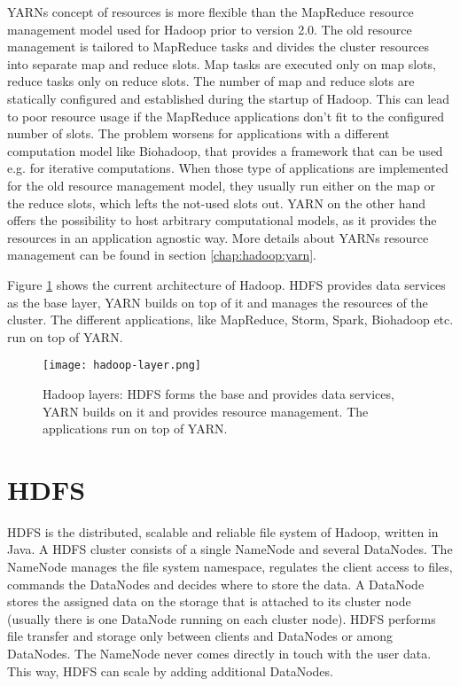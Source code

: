 YARNs concept of resources is more flexible than the MapReduce resource management model used for Hadoop prior to version 2.0. The old resource management is tailored to MapReduce tasks and divides the cluster resources into separate map and reduce slots. Map tasks are executed only on map slots, reduce tasks only on reduce slots. The number of map and reduce slots are statically configured and established during the startup of Hadoop. This can lead to poor resource usage if the MapReduce applications don't fit to the configured number of slots. The problem worsens for applications with a different computation model like Biohadoop, that provides a framework that can be used e.g. for iterative computations. When those type of applications are implemented for the old resource management model, they usually run either on the map or the reduce slots, which lefts the not-used slots out. YARN on the other hand offers the possibility to host arbitrary computational models, as it provides the resources in an application agnostic way. More details about YARNs resource management can be found in section \ref{chap:hadoop:yarn}.

Figure \ref{fig:hadoop-layer} shows the current architecture of Hadoop. HDFS provides data services as the base layer, YARN builds on top of it and manages the resources of the cluster. The different applications, like MapReduce, Storm, Spark, Biohadoop etc. run on top of YARN.

\begin{figure}[ht!]
  \centering
  \texttt{[image: hadoop-layer.png]}
  \caption{Hadoop layers: HDFS forms the base and provides data services, YARN builds on it and provides resource management. The applications run on top of YARN.}
  \label{fig:hadoop-layer}
\end{figure}

\section{HDFS}
\label{chap:hadoop:hdfs}
HDFS is the distributed, scalable and reliable file system of Hadoop, written in Java. A HDFS cluster consists of a single NameNode and several DataNodes. The NameNode manages the file system namespace, regulates the client access to files, commands the DataNodes and decides where to store the data. A DataNode stores the assigned data on the storage that is attached to its cluster node (usually there is one DataNode running on each cluster node). HDFS performs file transfer and storage only between clients and DataNodes or among DataNodes. The NameNode never comes directly in touch with the user data. This way, HDFS can scale by adding additional DataNodes.

